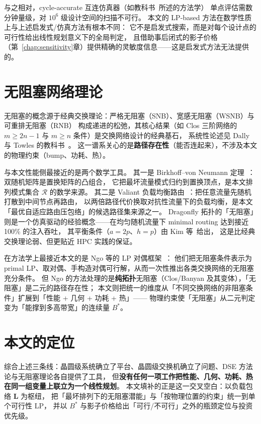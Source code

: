 与之相对，cycle-accurate 互连仿真器（如教科书~\cite{dally2004principles}所述的方法学）
单点评估需数分钟量级，对 $10^6$ 级设计空间的扫描不可行。
本文的 LP-based 方法在数学性质上与上述启发式/仿真方法有根本不同：
它不是启发式搜索，而是对每个设计点的可行性给出线性规划意义下的全局判定，
且借助事后闭式的影子价格（第~\ref{chap:sensitivity}章）提供精确的灵敏度信息——这是启发式方法无法提供的。

\section{无阻塞网络理论}\label{sec:rw-nonblocking}

无阻塞的概念源于经典交换理论：严格无阻塞（SNB）、宽感无阻塞（WSNB）与可重排无阻塞（RNB）
构成递进的松弛，其核心结果（如 Clos 三阶网络的 $m\ge 2n-1$ 与 $m\ge n$ 条件）是交换网络设计的经典基石，
系统性论述见 Dally 与 Towles 的教科书~\cite{dally2004principles}。
这一谱系关心的是\textbf{路径存在性}（能否连起来），不涉及本文的物理约束（bump、功耗、热）。

与本文性能侧最接近的是两个数学工具。
其一是 Birkhoff--von Neumann 定理~\cite{birkhoff1946tres}：双随机矩阵是置换矩阵的凸组合，
它把最坏流量模式归约到置换顶点，是本文排列模式集合 $\mathcal{R}$ 的数学来源。
其二是 Valiant 负载均衡路由~\cite{valiant1982scheme}：把任意流量先随机打散到中间节点再路由，
以两倍路径代价换取对抗性流量下的负载均衡，是本文「最优自适应路由压包络」的候选路径集来源之一。
Dragonfly 拓扑的「无阻塞」则是一个仿真驱动的经验概念——在均匀随机流量下 minimal routing 达到接近 100\% 的注入吞吐，
其平衡条件（$a=2p$、$h=p$）由 Kim 等~\cite{kim2008technology}给出，
这是比经典交换理论弱、但更贴近 HPC 实践的保证。

在方法学上最接近本文的是 Ngo 等的 LP 对偶框架~\cite{ngo2010lp-nonblocking}：
他们把无阻塞条件表示为 primal LP、取对偶、手构造对偶可行解，从而一次性推出各类交换网络的无阻塞充分条件。
但 Ngo 的方法处理的是\textbf{纯拓扑}无阻塞（Clos/Banyan 及其变体），「无阻塞」是二元的路径存在性；
本文则把统一的维度从「不同交换网络的非阻塞条件」扩展到「性能 + 几何 + 功耗 + 热」——
物理约束使「无阻塞」从二元判定变为「能撑到多高带宽」的连续量 $B^*$。

\section{本文的定位}\label{sec:rw-position}

综合上述三条线：晶圆级系统确立了平台、晶圆级交换机确立了问题、DSE 方法论与无阻塞理论各自提供了工具，
但\textbf{没有任何一项工作把性能、几何、功耗、热在同一组变量上联立为一个线性规划}。
本文填补的正是这一交叉空白：以负载包络 $\mathbf{L}$ 为枢纽，
把「最坏排列下的无阻塞潜能」与「按物理位置的约束」统一到单个可行性 LP，
并以 $B^*$ 与影子价格给出「可行/不可行」之外的瓶颈定位与投资优先级。
